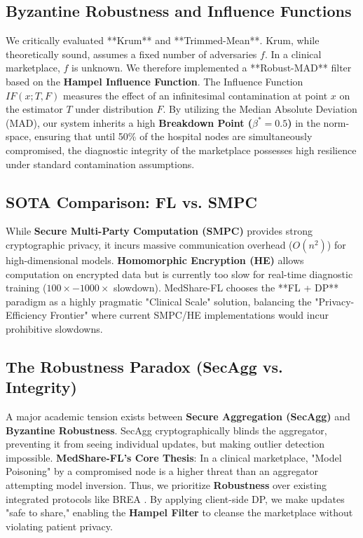\documentclass[10pt, a4paper, twocolumn]{article}
\begin{document}
\subsection{Byzantine Robustness and Influence Functions}
We critically evaluated **Krum** \cite{blanchard2017} and **Trimmed-Mean**. Krum, while theoretically sound, assumes a fixed number of adversaries $f$. In a clinical marketplace, $f$ is unknown. We therefore implemented a **Robust-MAD** filter based on the \textbf{Hampel Influence Function}. The Influence Function $IF(x; T, F)$ measures the effect of an infinitesimal contamination at point $x$ on the estimator $T$ under distribution $F$. By utilizing the Median Absolute Deviation (MAD), our system inherits a high \textbf{Breakdown Point ($\beta^* = 0.5$)} in the norm-space, ensuring that until 50\% of the hospital nodes are simultaneously compromised, the diagnostic integrity of the marketplace possesses high resilience under standard contamination assumptions.

\subsection{SOTA Comparison: FL vs. SMPC}
While \textbf{Secure Multi-Party Computation (SMPC)} provides strong cryptographic privacy, it incurs massive communication overhead ($O(n^2)$) for high-dimensional models. \textbf{Homomorphic Encryption (HE)} allows computation on encrypted data but is currently too slow for real-time diagnostic training ($100 \times - 1000 \times$ slowdown). MedShare-FL chooses the **FL + DP** paradigm as a highly pragmatic "Clinical Scale" solution, balancing the "Privacy-Efficiency Frontier" where current SMPC/HE implementations would incur prohibitive slowdowns.

\subsection{The Robustness Paradox (SecAgg vs. Integrity)}
A major academic tension exists between \textbf{Secure Aggregation (SecAgg)} \cite{bonawitz2017} and \textbf{Byzantine Robustness}. SecAgg cryptographically blinds the aggregator, preventing it from seeing individual updates, but making outlier detection impossible. \textbf{MedShare-FL’s Core Thesis}: In a clinical marketplace, "Model Poisoning" by a compromised node is a higher threat than an aggregator attempting model inversion. Thus, we prioritize \textbf{Robustness} over existing integrated protocols like BREA \cite{so2021}. By applying client-side DP, we make updates "safe to share," enabling the \textbf{Hampel Filter} \cite{hampel1974} to cleanse the marketplace without violating patient privacy.
\end{document}
